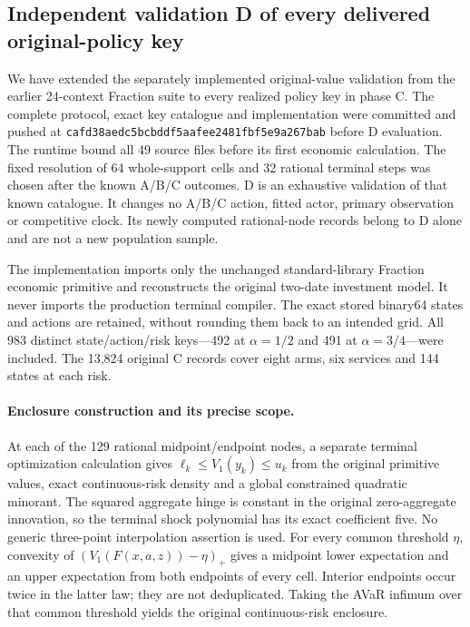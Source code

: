 \subsection{Independent validation D of every delivered original-policy key}
\label{response:independentvalidation119}

We have extended the separately implemented original-value validation from the
earlier 24-context Fraction suite to every realized policy key in phase C.
The complete protocol, exact key catalogue and implementation were committed
and pushed at \nolinkurl{cafd38aedc5bcbddf5aafee2481fbf5e9a267bab} before D
evaluation. The runtime bound all 49 source files before its first economic
calculation. The fixed resolution of 64 whole-support cells and 32 rational
terminal steps was chosen after the known A/B/C outcomes. D is an exhaustive
validation of that known catalogue. It changes no A/B/C action, fitted actor,
primary observation or competitive clock. Its newly computed rational-node
records belong to D alone and are not a new population sample.

The implementation imports only the unchanged standard-library Fraction
economic primitive and reconstructs the original two-date investment model.
It never imports the production terminal compiler. The exact stored binary64
states and actions are retained, without rounding them back to an intended
grid. All 983 distinct state/action/risk keys---492 at $\alpha=1/2$ and 491 at
$\alpha=3/4$---were included. The 13,824 original C records cover eight arms,
six services and 144 states at each risk.

\paragraph{Enclosure construction and its precise scope.}
At each of the 129 rational midpoint/endpoint nodes, a separate terminal
optimization calculation gives $\ell_k\le V_1(y_k)\le u_k$ from the original
primitive values, exact continuous-risk density and a global constrained
quadratic minorant. The squared aggregate hinge is constant in the original
zero-aggregate innovation, so the terminal shock polynomial has its exact
coefficient five. No generic three-point interpolation assertion is used.
For every common threshold $\eta$, convexity of
$(V_1(F(x,a,z))-\eta)_+$ gives a midpoint lower expectation and an upper
expectation from both endpoints of every cell. Interior endpoints occur
twice in the latter law; they are not deduplicated. Taking the AVaR infimum
over that common threshold yields the original continuous-risk enclosure.

